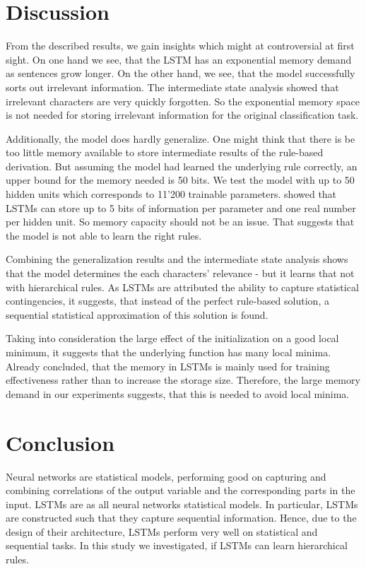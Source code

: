 \documentclass[11pt,a4paper]{article}
\begin{document}
\section{Discussion}

From the described results, we gain insights which might at controversial at first sight. On one hand we see, that the LSTM has an exponential memory demand as sentences grow longer. On the other hand, we see, that the model successfully sorts out irrelevant information. The intermediate state analysis showed that irrelevant characters are very quickly forgotten. So the exponential memory space is not needed for storing irrelevant information for the original classification task.

Additionally, the model does hardly generalize. One might think that there is be too little memory available to store intermediate results of the rule-based derivation. But assuming the model had learned the underlying rule correctly, an upper bound for the memory needed is 50 bits. We test the model with up to 50 hidden units which corresponds to 11'200 trainable parameters. \citeauthor{collins2016capacity}  showed that LSTMs can store up to 5 bits of information per parameter and one real number per hidden unit. So memory capacity should not be an issue. That suggests that the model is not able to learn the right rules.

Combining the generalization results and the intermediate state analysis shows that the model determines the each characters' relevance - but it learns that not with hierarchical rules. As LSTMs are attributed the ability to capture statistical contingencies, it suggests, that instead of the perfect rule-based solution, a sequential statistical approximation of this solution is found.

Taking into consideration the large effect of the initialization on a good local minimum, it suggests that the underlying function has many local minima. Already \citeauthor{collins2016capacity}  concluded, that the memory in LSTMs is mainly used for training effectiveness rather than to increase the storage size. Therefore, the large memory demand in our experiments suggests, that this is needed to avoid local minima.

\section{Conclusion}

Neural networks are statistical models, performing good on capturing and combining correlations of the output variable and the corresponding parts in the input. LSTMs are as all neural networks statistical models. In particular, LSTMs are constructed such that they capture sequential information. Hence, due to the design of their architecture, LSTMs perform very well on statistical and sequential tasks. In this study we investigated, if LSTMs can learn hierarchical rules.
\end{document}
